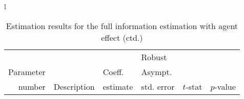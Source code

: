 \documentclass[12pt,a4paper]{article}
\begin{document}
 \begin{table}[htb]
\caption{\label{tab:fi-sc-2}Estimation results for the full information
  estimation with agent effect (ctd.)}
  \begin{tabular}{l}
\begin{tabular}{rlr@{.}lr@{.}lr@{.}lr@{.}l}
         &                       &   \multicolumn{2}{l}{}    & \multicolumn{2}{l}{Robust}  &     \multicolumn{4}{l}{}   \\
Parameter &                       &   \multicolumn{2}{l}{Coeff.}      & \multicolumn{2}{l}{Asympt.}  &     \multicolumn{4}{l}{}   \\
number &  Description                     &   \multicolumn{2}{l}{estimate}      & \multicolumn{2}{l}{std. error}  &   \multicolumn{2}{l}{$t$-stat}  &   \multicolumn{2}{l}{$p$-value}   \\

\hline


\end{tabular}
\end{tabular}
\end{table}
\end{document}
